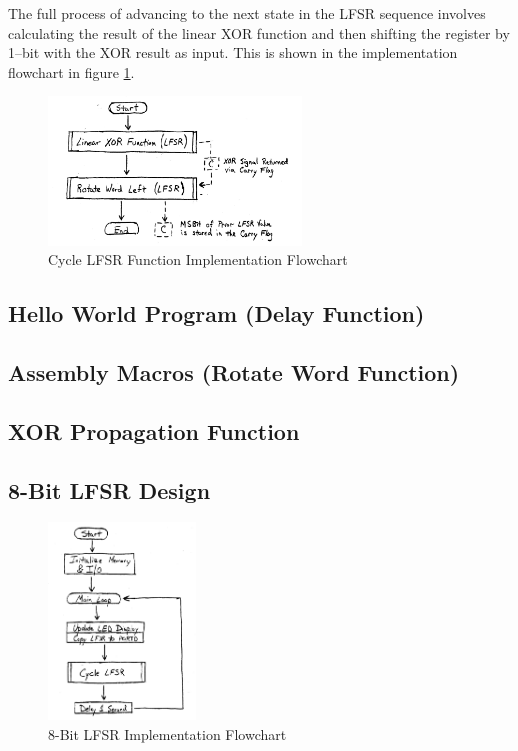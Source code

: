 \documentclass[11pt]{article}
\begin{document}
The full process of advancing to the next state in the LFSR sequence involves
calculating the result of the linear XOR function and then shifting the register
by 1--bit with the XOR result as input. This is shown in the implementation
flowchart in figure \ref{cycle-lfsr-flowchart}.

\begin{figure}
	\centering
	\includegraphics[width=0.6\textwidth]{Figures/cycle-lfsr-flowchart.pdf}
	\caption{Cycle LFSR Function Implementation Flowchart}
	\label{cycle-lfsr-flowchart}
\end{figure}

\subsection{Hello World Program (Delay Function)}

\subsection{Assembly Macros (Rotate Word Function)}

\subsection{XOR Propagation Function}

\subsection{8-Bit LFSR Design}

\begin{figure}
	\centering
	\includegraphics[width=0.35\textwidth]{Figures/8-bit-lfsr-flowchart.pdf}
	\caption{8-Bit LFSR Implementation Flowchart}
	\label{8-bit-lfsr-flowchart}
\end{figure}
\end{document}
